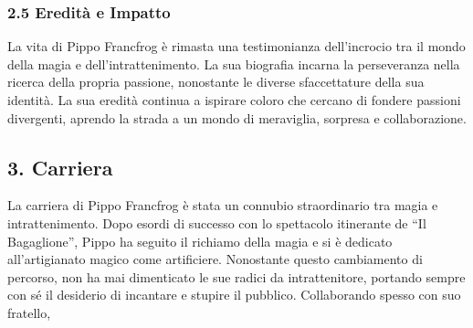 \subsubsection{\texorpdfstring{2.5 \textbf{Eredità e
Impatto}}{2.5 Eredità e Impatto}}\label{eredituxe0-e-impatto}

La vita di Pippo Francfrog è rimasta una testimonianza dell'incrocio tra
il mondo della magia e dell'intrattenimento. La sua biografia incarna la
perseveranza nella ricerca della propria passione, nonostante le diverse
sfaccettature della sua identità. La sua eredità continua a ispirare
coloro che cercano di fondere passioni divergenti, aprendo la strada a
un mondo di meraviglia, sorpresa e collaborazione.

\subsection{3. Carriera}\label{carriera}


La carriera di Pippo Francfrog è stata un connubio straordinario tra
magia e intrattenimento. Dopo esordi di successo con lo spettacolo
itinerante de ``Il Bagaglione'', Pippo ha seguito il richiamo della
magia e si è dedicato all'artigianato magico come artificiere.
Nonostante questo cambiamento di percorso, non ha mai dimenticato le sue
radici da intrattenitore, portando sempre con sé il desiderio di
incantare e stupire il pubblico. Collaborando spesso con suo fratello,
